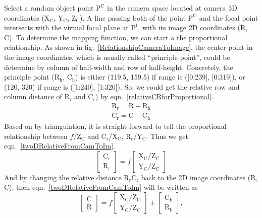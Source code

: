 Select a random object point \(\text{P}^\text{C}\) in the camera space located at camera 3D coordinates (\(\text{X}_\text{C}\), \(\text{Y}_\text{C}\), \(\text{Z}_\text{C}\)). A line passing both of the point \(\text{P}^\text{C}\) and the focal point intersects with the virtual focal plane at \(\text{P}^\text{I}\), with its image 2D coordinates (R, C). To determine the mapping function, we can start a the proportional relationship. As shown in fig.~\ref{RelationshipCameraToImage}, the center point in the image coordinates, which is usually called \enquote{principle point}, could be determine by column of half-width and row of half-height. Concretely, the principle point (\(\text{R}_\text{h}\), \(\text{C}_\text{h}\)) is either (119.5, 159.5) if range is ([0:239], [0:319]), or (120, 320) if range is ([1:240], [1:320]). So, we could get the relative row and column distance of  \(\text{R}_\text{r}\) and \(\text{C}_\text{r}\)) by eqn.~\ref{relativeCRforProportional}.
%
\begin{equation}
\begin{aligned}
\text{R}_\text{r} = \text{R} - \text{R}_\text{h}%
\\%
\text{C}_\text{r} = \text{C} - \text{C}_\text{h}%
\end{aligned}
\label{relativeCRforProportional}
\end{equation}%
%
Based on by triangulation, it is straight forward to tell the proportional relationship between \(f\)/\(\text{Z}_\text{C}\) and \(\text{C}_\text{r}\)/\(\text{X}_\text{C}\), \(\text{R}_\text{r}\)/\(\text{Y}_\text{C}\). Thus we get eqn.~\ref{twoDRelativeFromCamToIm}.
%
\begin{equation}
\left[ \begin{array}{c} \text{C}_\text{r} \\ \text{R}_\text{r} \end{array} \right] %
= f %
\left[ \begin{array}{c} \text{X}_\text{C}/\text{Z}_\text{C} \\ \text{Y}_\text{C}/\text{Z}_\text{C} \end{array} \right]%
\label{twoDRelativeFromCamToIm}
\end{equation}
\noindent
And by changing the relative distance \(\text{R}_\text{r}\text{C}_\text{r}\) back to the 2D image coordinates (R, C), then eqn.~\ref{twoDRelativeFromCamToIm} will be written as
%
\begin{equation}
\left[ \begin{array}{c} \text{C} \\ \text{R} \end{array} \right] %
= f %
\left[ \begin{array}{c} \text{X}_\text{C}/\text{Z}_\text{C} \\ \text{Y}_\text{C}/\text{Z}_\text{C} \end{array} \right]%
+
\left[ \begin{array}{c}  \text{C}_\text{h} \\  \text{R}_\text{h} \end{array} \right] ,%
\label{linearRelationFromCamToIm}
\end{equation}

